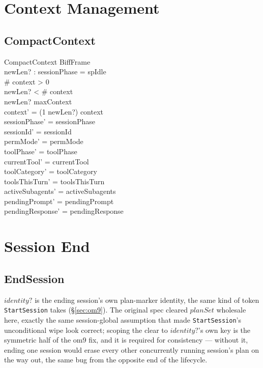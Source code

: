 \documentclass[a4paper,10pt,fleqn]{article}
\begin{document}
\section{Context Management}

\subsection{CompactContext}

\begin{schema}{CompactContext}
  BiffFrame \\
  newLen? : \nat
  \where
  sessionPhase = spIdle \\
  \# context > 0 \\
  newLen? < \# context \\
  newLen? \leq maxContext \\
  context' = (1 \upto newLen?) \dres context \\
  sessionPhase' = sessionPhase \\
  sessionId' = sessionId \\
  permMode' = permMode \\
  toolPhase' = toolPhase \\
  currentTool' = currentTool \\
  toolCategory' = toolCategory \\
  toolsThisTurn' = toolsThisTurn \\
  activeSubagents' = activeSubagents \\
  pendingPrompt' = pendingPrompt \\
  pendingResponse' = pendingResponse
\end{schema}

\section{Session End}

\subsection{EndSession}

$identity?$ is the ending session's own plan-marker identity, the same
kind of token \texttt{StartSession} takes (\S\ref{sec:om9}).  The
original spec cleared $planSet$ wholesale here, exactly the same
session-global assumption that made \texttt{StartSession}'s unconditional
wipe look correct; scoping the clear to $identity?$'s own key is the
symmetric half of the om9 fix, and it is required for consistency ---
without it, ending one session would erase every other concurrently
running session's plan on the way out, the same bug from the opposite
end of the lifecycle.
\end{document}
